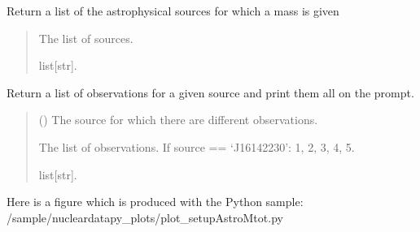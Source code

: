 \documentclass[letterpaper,10pt,english]{sphinxmanual}
\begin{document}
\begin{fulllineitems}
\label{\detokenize{source/api/setup_astro_mtot:nucleardatapy.setup_astro_mtot.astro_mtot}}
\pysigstartsignatures
\pysiglinewithargsret
{}
{}
{}
\pysigstopsignatures
\sphinxAtStartPar
Return a list of the astrophysical sources for which a mass is given
\begin{quote}\begin{description}
\sphinxAtStartPar
The list of sources.

\sphinxAtStartPar
list{[}str{]}.

\end{description}\end{quote}

\end{fulllineitems}


\begin{fulllineitems}
\label{\detokenize{source/api/setup_astro_mtot:nucleardatapy.setup_astro_mtot.astro_mtot_source}}
\pysigstartsignatures
\pysiglinewithargsret
{}
{}
{}
\pysigstopsignatures
\sphinxAtStartPar
Return a list of observations for a given source and print them all on the prompt.
\begin{quote}\begin{description}
\sphinxAtStartPar
{} () \textendash{} The source for which there are different observations.

\sphinxAtStartPar
The list of observations.     If source == ‘J1614\textendash{}2230’: 1, 2, 3, 4, 5.

\sphinxAtStartPar
list{[}str{]}.

\end{description}\end{quote}

\end{fulllineitems}


\sphinxAtStartPar
Here is a figure which is produced with the Python sample: /sample/nucleardatapy\_plots/plot\_setupAstroMtot.py
\end{document}

